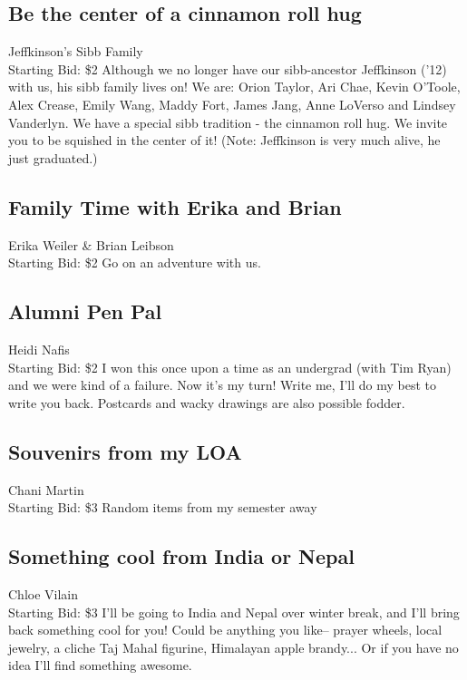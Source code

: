 \documentclass[11pt]{article}
\begin{document}
\subsection{Be the center of a cinnamon roll hug}
Jeffkinson's Sibb Family
\\
Starting Bid: \$2
\newline
Although we no longer have our sibb-ancestor Jeffkinson ('12) with us, his sibb family lives on! We are: Orion Taylor, Ari Chae, Kevin O'Toole, Alex Crease, Emily Wang, Maddy Fort, James Jang, Anne LoVerso and Lindsey Vanderlyn. We have a special sibb tradition - the cinnamon roll hug. We invite you to be squished in the center of it! (Note: Jeffkinson is very much alive, he just graduated.)
\subsection{Family Time with Erika and Brian}
Erika Weiler \& Brian Leibson
\\
Starting Bid: \$2
\newline
Go on an adventure with us.
\subsection{Alumni Pen Pal}
Heidi Nafis
\\
Starting Bid: \$2
\newline
I won this once upon a time as an undergrad (with Tim Ryan) and we were kind of a failure. Now it's my turn! Write me, I'll do my best to write you back. Postcards and wacky drawings are also possible fodder.
\subsection{Souvenirs from my LOA}
Chani Martin
\\
Starting Bid: \$3
\newline
Random items from my semester away
\subsection{Something cool from India or Nepal}
Chloe Vilain
\\
Starting Bid: \$3
\newline
I'll be going to India and Nepal over winter break, and I'll bring back something cool for you! Could be anything you like-- prayer wheels, local jewelry, a cliche Taj Mahal figurine, Himalayan apple brandy... Or if you have no idea I'll find something awesome. 
\end{document}
